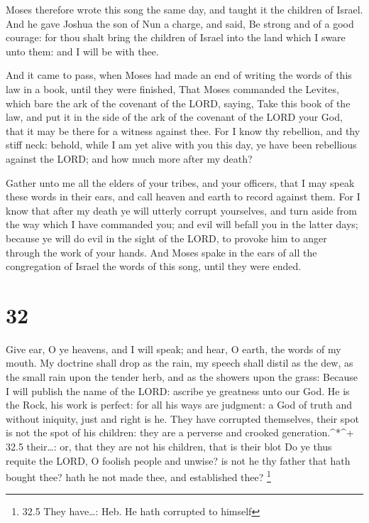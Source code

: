  Moses therefore wrote this song the same day, and taught
it the children of Israel.  And he gave Joshua the son of
Nun a charge, and said, Be strong and of a good courage: for thou shalt
bring the children of Israel into the land which I sware unto them: and
I will be with thee.

 And it came to pass, when Moses had made an end of writing
the words of this law in a book, until they were finished, 
That Moses commanded the Levites, which bare the ark of the covenant of
the LORD, saying,  Take this book of the law, and put it in
the side of the ark of the covenant of the LORD your God, that it may be
there for a witness against thee.  For I know thy
rebellion, and thy stiff neck: behold, while I am yet alive with you
this day, ye have been rebellious against the LORD; and how much more
after my death?

 Gather unto me all the elders of your tribes, and your
officers, that I may speak these words in their ears, and call heaven
and earth to record against them.  For I know that after my
death ye will utterly corrupt yourselves, and turn aside from the way
which I have commanded you; and evil will befall you in the latter days;
because ye will do evil in the sight of the LORD, to provoke him to
anger through the work of your hands.  And Moses spake in
the ears of all the congregation of Israel the words of this song, until
they were ended.

\hypertarget{section-31}{%
\section{32}\label{section-31}}

 Give ear, O ye heavens, and I will speak; and hear, O
earth, the words of my mouth.  My doctrine shall drop as the
rain, my speech shall distil as the dew, as the small rain upon the
tender herb, and as the showers upon the grass:  Because I
will publish the name of the LORD: ascribe ye greatness unto our God.
 He is the Rock, his work is perfect: for all his ways are
judgment: a God of truth and without iniquity, just and right is he.
 They have corrupted themselves, their spot is not the spot
of his children: they are a perverse and crooked generation.\^{}*\^{}+
32.5 their\ldots: or, that they are not his children, that is their blot
 Do ye thus requite the LORD, O foolish people and unwise?
is not he thy father that hath bought thee? hath he not made thee, and
established thee? \footnote{32.5 They have\ldots: Heb. He hath corrupted
  to himself}

